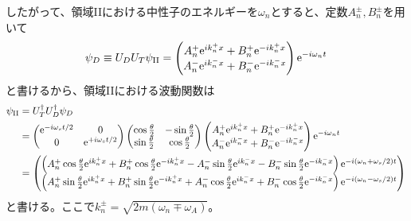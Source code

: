 \renewcommand{\arraystretch}{1.5}
したがって、領域IIにおける中性子のエネルギーを$\omega_n$とすると、定数$A_n^\pm,B_n^\pm$を用いて
\begin{equation}
\psi_D \equiv U_D U_T \psi_\mathrm{II} =\begin{pmatrix} A_n^+ \mathrm{e}^{ik_n^+x}+B_n^+\mathrm{e}^{-ik_n^+x} \\ A_n^- \mathrm{e}^{ik_n^-x}+B_n^-\mathrm{e}^{-ik_n^-x} \end{pmatrix} \mathrm{e}^{-i\omega_n t}
\end{equation}
と書けるから、領域IIにおける波動関数は
\begin{align}
\psi_\mathrm{II}&=U_T^\dagger U_D^\dagger \psi_D \notag \\
&=\begin{pmatrix} \mathrm{e}^{-i\omega_st/2} &0\\0&\mathrm{e}^{+i\omega_st/2}\end{pmatrix} \begin{pmatrix} \cos\frac{\theta}{2}& -\sin\frac{\theta}{2}\\  \sin\frac{\theta}{2}& \cos\frac{\theta}{2}\end{pmatrix} \begin{pmatrix} A_n^+ \mathrm{e}^{ik_n^+x}+B_n^+\mathrm{e}^{-ik_n^+x} \\ A_n^- \mathrm{e}^{ik_n^-x}+B_n^-\mathrm{e}^{-ik_n^-x} \end{pmatrix} \mathrm{e}^{-i\omega_n t} \notag \\
&=\begin{pmatrix} \left(A_n^+ \cos \frac{\theta}{2} \mathrm{e}^{ik_n^+x}+ B_n^+ \cos \frac{\theta}{2} \mathrm{e}^{-ik_n^+x} - A_n^- \sin \frac{\theta}{2} \mathrm{e}^{ik_n^-x}- B_n^- \sin \frac{\theta}{2} \mathrm{e}^{-ik_n^-x}\right) \mathrm{e}^{-i(\omega_n+\omega_s/2)t} \\ \left(A_n^+ \sin \frac{\theta}{2} \mathrm{e}^{ik_n^+x}+ B_n^+ \sin \frac{\theta}{2} \mathrm{e}^{-ik_n^+x} + A_n^- \cos \frac{\theta}{2} \mathrm{e}^{ik_n^-x}+ B_n^- \cos \frac{\theta}{2} \mathrm{e}^{-ik_n^-x}\right) \mathrm{e}^{-i(\omega_n-\omega_s/2)t} \end{pmatrix} \label{Resonance_psi2}
\end{align}
と書ける。ここで$k_n^\pm=\sqrt{2m(\omega_n \mp \omega_A)}$。

